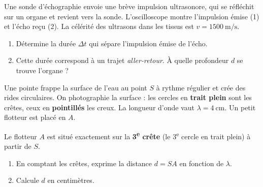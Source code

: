 \documentclass[11pt,a4paper]{article}
\begin{document}
\begin{exo}
Une sonde d'échographie envoie une brève impulsion ultrasonore, qui se réfléchit sur un
organe et revient vers la sonde. L'oscilloscope montre l'impulsion émise (1) et l'écho reçu (2).
La célérité des ultrasons dans les tissus est $v=\SI{1500}{\metre\per\second}$.
\begin{center}
\end{center}
\begin{enumerate}[label=\alph*)]
  \item Détermine la durée $\Delta t$ qui sépare l'impulsion émise de l'écho.
  \item Cette durée correspond à un trajet \emph{aller-retour}. À quelle profondeur $d$ se
        trouve l'organe ?
\end{enumerate}
\end{exo}

\begin{exo}
Une pointe frappe la surface de l'eau au point $S$ à rythme régulier et crée des rides
circulaires. On photographie la surface : les cercles en \textbf{trait plein} sont les crêtes,
ceux en \textbf{pointillés} les creux. La longueur d'onde vaut $\lambda=\SI{4}{\centi\metre}$.
Un petit flotteur est placé en $A$.
\begin{center}
\end{center}
Le flotteur $A$ est situé exactement sur la \textbf{3\textsuperscript{e} crête} (le 3\textsuperscript{e}
cercle en trait plein) à partir de $S$.
\begin{enumerate}[label=\alph*)]
  \item En comptant les crêtes, exprime la distance $d=SA$ en fonction de $\lambda$.
  \item Calcule $d$ en centimètres.
\end{enumerate}
\end{exo}
\end{document}
